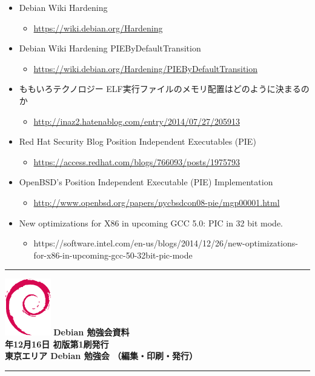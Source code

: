 \documentclass[mingoth,a4paper]{jsarticle}
\newcommand{\debmtgyear}{2017}
\newcommand{\debmtgmonth}{12}
\newcommand{\debmtgdate}{16}
\begin{document}
\begin{itemize}
\item Debian Wiki Hardening
  \begin{itemize}
  \item \url{https://wiki.debian.org/Hardening}
  \end{itemize}
\item Debian Wiki Hardening PIEByDefaultTransition
  \begin{itemize}
  \item \url{https://wiki.debian.org/Hardening/PIEByDefaultTransition}
  \end{itemize}
\item ももいろテクノロジー ELF実行ファイルのメモリ配置はどのように決まるのか
  \begin{itemize}
  \item \url{http://inaz2.hatenablog.com/entry/2014/07/27/205913}
  \end{itemize}
\item Red Hat Security Blog Position Independent Executables (PIE)
  \begin{itemize}
  \item \url{https://access.redhat.com/blogs/766093/posts/1975793}
  \end{itemize}
\item OpenBSD's Position Independent Executable (PIE) Implementation
  \begin{itemize}
  \item \url{http://www.openbsd.org/papers/nycbsdcon08-pie/mgp00001.html}
  \end{itemize}
\item New optimizations for X86 in upcoming GCC 5.0: PIC in 32 bit mode.
  \begin{itemize}
  \item https://software.intel.com/en-us/blogs/2014/12/26/new-optimizations-for-x86-in-upcoming-gcc-50-32bit-pic-mode
  \end{itemize}
\end{itemize}


%
\mbox{}\newpage
\mbox{}\newpage


\vspace*{15cm}
\hrule
\vspace{2mm}
\includegraphics[width=2cm]{image200502/openlogo-nd.eps}
\noindent \Large \bf Debian 勉強会資料\\
\noindent \normalfont \debmtgyear{}年\debmtgmonth{}月\debmtgdate{}日 \hspace{5mm}  初版第1刷発行\\
\noindent \normalfont 東京エリア Debian 勉強会 （編集・印刷・発行）\\
\hrule
\end{document}
